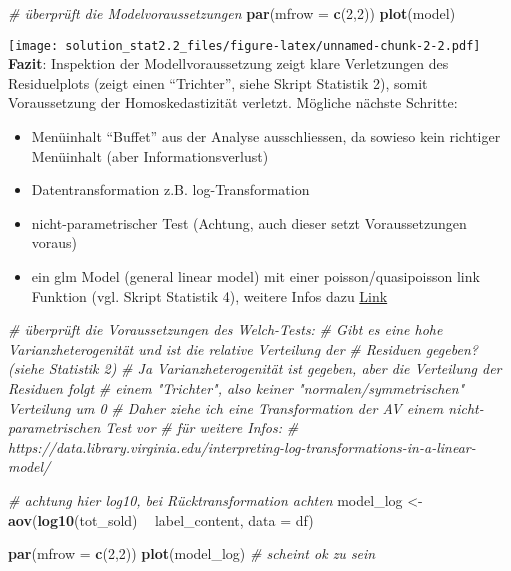\documentclass[
]{article}
\newenvironment{Shaded}{\begin{snugshade}}{\end{snugshade}}
\newcommand{\CommentTok}[1]{\textcolor[rgb]{0.56,0.35,0.01}{\textit{#1}}}
\newcommand{\DataTypeTok}[1]{\textcolor[rgb]{0.13,0.29,0.53}{#1}}
\newcommand{\DecValTok}[1]{\textcolor[rgb]{0.00,0.00,0.81}{#1}}
\newcommand{\KeywordTok}[1]{\textcolor[rgb]{0.13,0.29,0.53}{\textbf{#1}}}
\newcommand{\NormalTok}[1]{#1}
\newcommand{\OperatorTok}[1]{\textcolor[rgb]{0.81,0.36,0.00}{\textbf{#1}}}
\newcommand{\StringTok}[1]{\textcolor[rgb]{0.31,0.60,0.02}{#1}}
\providecommand{\tightlist}{%
  \setlength{\itemsep}{0pt}\setlength{\parskip}{0pt}}
\begin{document}
\begin{Shaded}
\begin{Highlighting}[]
\CommentTok{# überprüft die Modelvoraussetzungen}
\KeywordTok{par}\NormalTok{(}\DataTypeTok{mfrow =} \KeywordTok{c}\NormalTok{(}\DecValTok{2}\NormalTok{,}\DecValTok{2}\NormalTok{))}
\KeywordTok{plot}\NormalTok{(model)}
\end{Highlighting}
\end{Shaded}

\texttt{[image: solution\_stat2.2\_files/figure-latex/unnamed-chunk-2-2.pdf]}
\\
\textbf{Fazit}: Inspektion der Modellvoraussetzung zeigt klare
Verletzungen des Residuelplots (zeigt einen ``Trichter'', siehe Skript
Statistik 2), somit Voraussetzung der Homoskedastizität verletzt.
Mögliche nächste Schritte:

\begin{itemize}
\tightlist
\item
  Menüinhalt ``Buffet'' aus der Analyse ausschliessen, da sowieso kein
  richtiger Menüinhalt (aber Informationsverlust)
\item
  Datentransformation z.B. log-Transformation
\item
  nicht-parametrischer Test (Achtung, auch dieser setzt Voraussetzungen
  voraus)
\item
  ein glm Model (general linear model) mit einer poisson/quasipoisson
  link Funktion (vgl. Skript Statistik 4), weitere Infos dazu
  \href{https://www.ncbi.nlm.nih.gov/pmc/articles/PMC5869353/}{Link} 
\end{itemize}

\begin{Shaded}
\begin{Highlighting}[]
\CommentTok{# überprüft die Voraussetzungen des Welch-Tests:}
\CommentTok{# Gibt es eine hohe Varianzheterogenität und ist die relative Verteilung der }
\CommentTok{# Residuen gegeben? (siehe Statistik 2)}
\CommentTok{# Ja Varianzheterogenität ist gegeben, aber die Verteilung der Residuen folgt }
\CommentTok{# einem "Trichter", also keiner "normalen/symmetrischen" Verteilung um 0}
\CommentTok{# Daher ziehe ich eine Transformation der AV einem nicht-parametrischen Test vor}
\CommentTok{# für weitere Infos: }
\CommentTok{# https://data.library.virginia.edu/interpreting-log-transformations-in-a-linear-model/}

\CommentTok{# achtung hier log10, bei Rücktransformation achten}
\NormalTok{model_log <-}\StringTok{ }\KeywordTok{aov}\NormalTok{(}\KeywordTok{log10}\NormalTok{(tot_sold) }\OperatorTok{~}\StringTok{ }\NormalTok{label_content, }\DataTypeTok{data =}\NormalTok{ df) }

\KeywordTok{par}\NormalTok{(}\DataTypeTok{mfrow =} \KeywordTok{c}\NormalTok{(}\DecValTok{2}\NormalTok{,}\DecValTok{2}\NormalTok{))}
\KeywordTok{plot}\NormalTok{(model_log) }\CommentTok{# scheint ok zu sein}
\end{Highlighting}
\end{Shaded}
\end{document}
